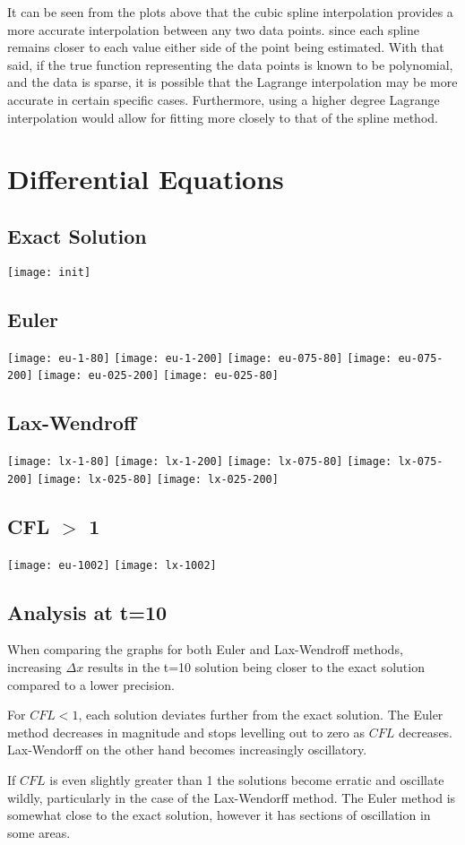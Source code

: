 \documentclass[10pt, twocolumn]{article}
\begin{document}
	It can be seen from the plots above that the cubic spline interpolation provides a more accurate interpolation between any two data points. since each spline remains closer to each value either side of the point being estimated. With that said, if the true function representing the data points is known to be polynomial, and the data is sparse, it is possible that the Lagrange interpolation may be more accurate in certain specific cases. Furthermore, using a higher degree Lagrange interpolation would allow for fitting more closely to that of the spline method.
	
\section{Differential Equations}
\subsection*{Exact Solution}
	\texttt{[image: init]}
\subsection*{Euler}
	\texttt{[image: eu-1-80]}
	\texttt{[image: eu-1-200]}
	\texttt{[image: eu-075-80]}
	\texttt{[image: eu-075-200]}
	\texttt{[image: eu-025-200]}
	\texttt{[image: eu-025-80]}
	
\subsection*{Lax-Wendroff}
	\texttt{[image: lx-1-80]}
	\texttt{[image: lx-1-200]}
	\texttt{[image: lx-075-80]}
	\texttt{[image: lx-075-200]}
	\texttt{[image: lx-025-80]}
	\texttt{[image: lx-025-200]}

\subsection*{CFL $>$ 1}
\texttt{[image: eu-1002]}
\texttt{[image: lx-1002]}

\subsection*{Analysis at t=10}

When comparing the graphs for both Euler and Lax-Wendroff methods, increasing $\Delta x$ results in the t=10 solution being closer to the exact solution compared to a lower precision.

For $CFL < 1$, each solution deviates further from the exact solution. The Euler method decreases in magnitude and stops levelling out to zero as $CFL$ decreases. Lax-Wendorff on the other hand becomes increasingly oscillatory.

If $CFL$ is even slightly greater than 1 the solutions become erratic and oscillate wildly, particularly in the case of the Lax-Wendorff method. The Euler method is somewhat close to the exact solution, however it has sections of oscillation in some areas.
\end{document}
